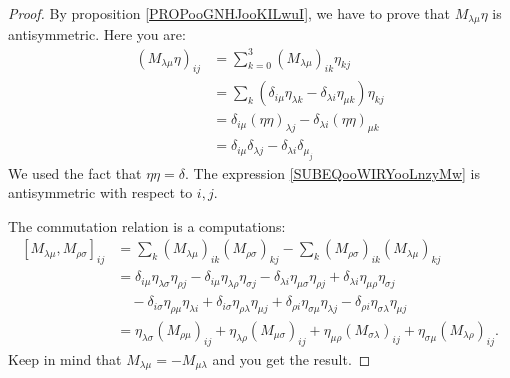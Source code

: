 \begin{proof}
    By proposition \ref{PROPooGNHJooKILwuI}, we have to prove that \( M_{\lambda\mu}\eta\) is antisymmetric. Here you are:
    \begin{subequations}
        \begin{align}
            (M_{\lambda\mu}\eta)_{ij}&=\sum_{k=0}^3(M_{\lambda\mu})_{ik}\eta_{kj}\\
            &=\sum_k(\delta_{i\mu}\eta_{\lambda k}-\delta_{\lambda i}\eta_{\mu k})\eta_{kj}\\
            &=\delta_{i\mu}(\eta\eta)_{\lambda j}-\delta_{\lambda i}(\eta\eta)_{\mu k}\\
            &=\delta_{i\mu}\delta_{\lambda j}-\delta_{\lambda i}\delta_{\mu_ j}     \label{SUBEQooWIRYooLnzyMw}
        \end{align}
    \end{subequations}
    We used the fact that \( \eta\eta=\delta\). The expression \eqref{SUBEQooWIRYooLnzyMw} is antisymmetric with respect to \( i,j\).

    The commutation relation is a computations:
    \begin{subequations}
        \begin{align}
            [M_{\lambda\mu},M_{\rho\sigma}]_{ij}&=\sum_k(M_{\lambda\mu})_{ik}(M_{\rho\sigma})_{kj}-\sum_k(M_{\rho\sigma})_{ik}(M_{\lambda\mu})_{kj}\\
            &=\delta_{i\mu}\eta_{\lambda\sigma}\eta_{\rho j}-\delta_{i\mu}\eta_{\lambda\rho}\eta_{\sigma j}
            -\delta_{\lambda i}\eta_{\mu\sigma}\eta_{\rho j}+\delta_{\lambda i}\eta_{\mu\rho}\eta_{\sigma j}\\
            &\quad-\delta_{i\sigma}\eta_{\rho\mu}\eta_{\lambda i}+\delta_{i\sigma}\eta_{\rho\lambda}\eta_{\mu j}
             +\delta_{\rho i}\eta_{\sigma\mu}\eta_{\lambda j}-\delta_{\rho i}\eta_{\sigma\lambda}\eta_{\mu j}\\
            &=\eta_{\lambda\sigma}(M_{\rho\mu})_{ij}+\eta_{\lambda\rho}(M_{\mu\sigma})_{ij}+\eta_{\mu\rho}(M_{\sigma\lambda})_{ij}+\eta_{\sigma\mu}(M_{\lambda\rho})_{ij}.
        \end{align}
    \end{subequations}
    Keep in mind that \( M_{\lambda\mu}=-M_{\mu\lambda}\) and you get the result.
\end{proof}


